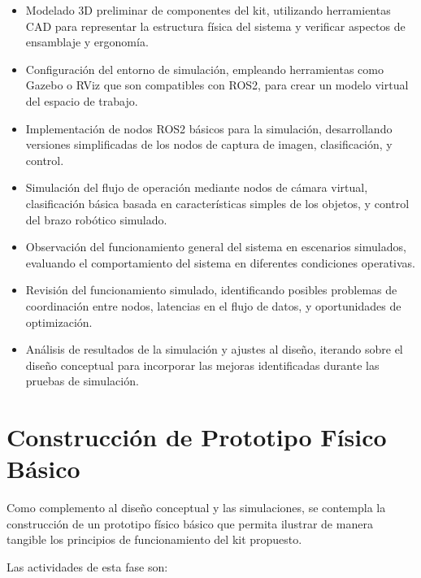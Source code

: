 \begin{itemize}
    \item Modelado 3D preliminar de componentes del kit, utilizando herramientas CAD para representar la estructura física del sistema y verificar aspectos de ensamblaje y ergonomía.
    
    \item Configuración del entorno de simulación, empleando herramientas como Gazebo o RViz que son compatibles con ROS2, para crear un modelo virtual del espacio de trabajo.
    
    \item Implementación de nodos ROS2 básicos para la simulación, desarrollando versiones simplificadas de los nodos de captura de imagen, clasificación, y control.
    
    \item Simulación del flujo de operación mediante nodos de cámara virtual, clasificación básica basada en características simples de los objetos, y control del brazo robótico simulado.
    
    \item Observación del funcionamiento general del sistema en escenarios simulados, evaluando el comportamiento del sistema en diferentes condiciones operativas.
    
    \item Revisión del funcionamiento simulado, identificando posibles problemas de coordinación entre nodos, latencias en el flujo de datos, y oportunidades de optimización.
    
    \item Análisis de resultados de la simulación y ajustes al diseño, iterando sobre el diseño conceptual para incorporar las mejoras identificadas durante las pruebas de simulación.
\end{itemize}

\section{Construcción de Prototipo Físico Básico}

Como complemento al diseño conceptual y las simulaciones, se contempla la construcción de un prototipo físico básico que permita ilustrar de manera tangible los principios de funcionamiento del kit propuesto.

Las actividades de esta fase son:


